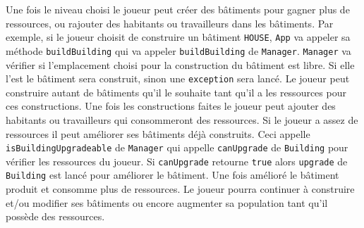 \documentclass[a4paper,11pt]{article}
\begin{document}
\par Une fois le niveau choisi le joueur peut créer des bâtiments pour gagner plus de ressources, ou rajouter des habitants ou travailleurs dans les bâtiments. Par exemple, si le joueur choisit de construire un bâtiment \texttt{HOUSE}, \texttt{App} va appeler sa méthode \texttt{buildBuilding} qui va appeler \texttt{buildBuilding} de \texttt{Manager}. \texttt{Manager} va vérifier si l'emplacement choisi pour la construction du bâtiment est libre. Si elle l'est le bâtiment sera construit, sinon une \texttt{exception} sera lancé. Le joueur peut construire autant de bâtiments qu'il le souhaite tant qu'il a les ressources pour ces constructions. Une fois les constructions faites le joueur peut ajouter des habitants ou travailleurs qui consommeront des ressources. Si le joueur a assez de ressources il peut améliorer ses bâtiments déjà construits. Ceci appelle \texttt{isBuildingUpgradeable} de \texttt{Manager} qui appelle \texttt{canUpgrade} de \texttt{Building} pour vérifier les ressources du joueur. Si \texttt{canUpgrade} retourne \texttt{true} alors \texttt{upgrade} de \texttt{Building} est lancé pour améliorer le bâtiment. Une fois amélioré le bâtiment produit et consomme plus de ressources. Le joueur pourra continuer à construire et/ou modifier ses bâtiments ou encore augmenter sa population tant qu'il possède des ressources.

\clearpage
\end{document}
